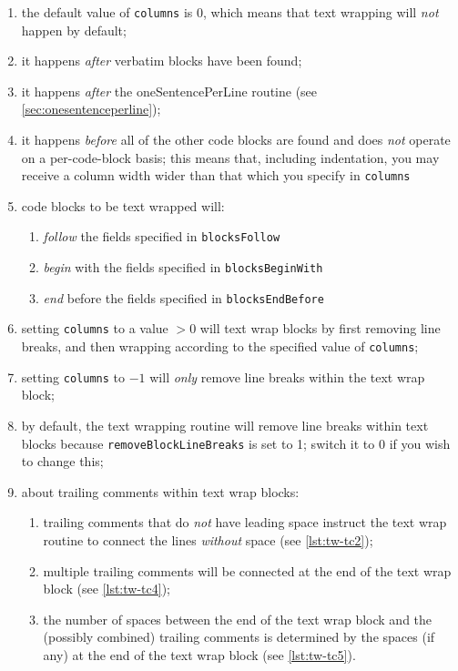  \begin{enumerate}
  \item the default value of \texttt{columns} is 0, which means that text wrapping will
        \emph{not} happen by default;
  \item it happens \emph{after} verbatim blocks have been found;
  \item it happens \emph{after} the oneSentencePerLine routine (see
        \cref{sec:onesentenceperline});
  \item it happens \emph{before} all of the other code blocks are found and does \emph{not}
        operate on a per-code-block basis; this means that, including indentation, you may
        receive a column width wider than that which you specify in \texttt{columns}
  \item code blocks to be text wrapped will:
        \begin{enumerate}
         \item \emph{follow} the fields specified in \texttt{blocksFollow}
         \item \emph{begin} with the fields specified in \texttt{blocksBeginWith}
         \item \emph{end} before the fields specified in \texttt{blocksEndBefore}
        \end{enumerate}
  \item setting \texttt{columns} to a value $>0$ will text wrap blocks by first removing line
        breaks, and then wrapping according to the specified value of \texttt{columns};
  \item setting \texttt{columns} to $-1$ will \emph{only} remove line breaks within the text wrap
        block;
  \item by default, the text wrapping routine will remove line breaks within text blocks because
        \texttt{removeBlockLineBreaks} is set to 1; switch it to 0 if you wish to change this;
  \item about trailing comments within text wrap blocks:
        \begin{enumerate}
         \item trailing comments that do \emph{not} have leading space instruct the text wrap routine to
               connect the lines \emph{without} space (see \cref{lst:tw-tc2});
         \item multiple trailing comments will be connected at the end of the text wrap block (see
               \cref{lst:tw-tc4});
         \item the number of spaces between the end of the text wrap block and the (possibly combined)
               trailing comments is determined by the spaces (if any) at the end of the text wrap block
               (see \cref{lst:tw-tc5}).
        \end{enumerate}
 \end{enumerate}

